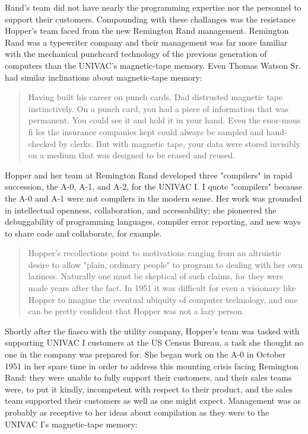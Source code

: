Rand's team did not have nearly the programming expertise nor the personnel
to support their customers.
Compounding with these challanges was the resistance Hopper's team faced from the new
Remington Rand management.
Remington Rand was a typewriter company and their management was far more familiar with
the mechanical punchcard technology of the previous generation of computers than the
UNIVAC's magnetic-tape memory.
Even Thomas Watson Sr. had similar inclinations about magnetic-tape memory:

\begin{quotation}
    Having built his career on punch cards, Dad distrusted magnetic tape 
instinctively. On a punch card, you had a piece of information that was 
permanent. You could see it and hold it in your hand. Even the enor-mous fi les 
the insurance companies kept could always be sampled and hand-checked by 
clerks. But with magnetic tape, your data were stored invisibly on a medium 
that was designed to be erased and reused.
\cite{grace_hopper_and_the_invention_of_the_information_age_2009}
\end{quotation}

Hopper and her team at Remington Rand developed three "compilers"
in rapid succession, the A-0, A-1, and A-2, for the UNIVAC I.
I quote "compilers" because the A-0 and A-1 were not compilers in the modern sense.
Her work was grounded in intellectual openness, collaboration, and accessability;
she pioneered the debuggability of programming languages, compiler error reporting,
and new ways to share code and collaborate, for example.

\begin{quotation}
Hopper's recollections point to motivations
ranging from an altruistic desire to allow "plain, ordinary people"
to program to dealing with her own laziness. Naturally one must
be skeptical of such claims, for they were made years after the
fact. In 1951 it was difficult for even a visionary like Hopper to
imagine the eventual ubiquity of computer technology, and one
can be pretty confident that Hopper was not a lazy person.
\cite{grace_hopper_and_the_invention_of_the_information_age_2009}
\end{quotation}

Shortly after the fiasco with the utility company, Hopper's team was tasked with supporting UNIVAC I customers
at the US Census Bureau, a task she thought no one in the company was prepared for.
She began work on the A-0 in October 1951 in her spare time in order to address
this mounting crisis facing Remington Rand: they were unable to fully support their
customers, and their sales teams were, to put it kindly, incompetent with respect
to their product, and the sales team supported their customers as well as one might expect.
Management was as probably as receptive to her ideas about compilation as they were to
the UNIVAC I's magnetic-tape memory:

